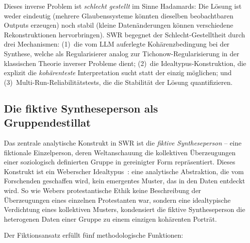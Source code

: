 \documentclass[11pt,a4paper]{article}
\begin{document}
Dieses inverse Problem ist \emph{schlecht gestellt} im Sinne Hadamards: Die Lösung ist weder eindeutig (mehrere Glaubenssysteme könnten dieselben beobachtbaren Outputs erzeugen) noch stabil (kleine Datenänderungen können verschiedene Rekonstruktionen hervorbringen). SWR begegnet der Schlecht-Gestelltheit durch drei Mechanismen: (1)~die vom LLM auferlegte Kohärenzbedingung bei der Synthese, welche als Regularisierer analog zur Tichonow-Regularisierung in der klassischen Theorie inverser Probleme dient; (2)~die Idealtypus-Konstruktion, die explizit die \emph{kohärenteste} Interpretation sucht statt der einzig möglichen; und (3)~Multi-Run-Reliabilitätstests, die die Stabilität der Lösung quantifizieren.


\subsection{Die fiktive Syntheseperson als Gruppendestillat}
\label{sec:method:fiction}

Das zentrale analytische Konstrukt in SWR ist die \emph{fiktive Syntheseperson} -- eine fiktionale Einzelperson, deren Weltanschauung die kollektiven Überzeugungen einer soziologisch definierten Gruppe in gereinigter Form repräsentiert. Dieses Konstrukt ist ein Weberscher Idealtypus~\citep{Weber1904}: eine analytische Abstraktion, die vom Forschenden geschaffen wird, kein emergentes Muster, das in den Daten entdeckt wird. So wie Webers \glqq{}protestantische Ethik\grqq{} keine Beschreibung der Überzeugungen eines einzelnen Protestanten war, sondern eine idealtypische Verdichtung eines kollektiven Musters, kondensiert die fiktive Syntheseperson die heterogenen Daten einer Gruppe zu einem einzigen kohärenten Porträt.

Der Fiktionsansatz erfüllt fünf methodologische Funktionen:
\end{document}
